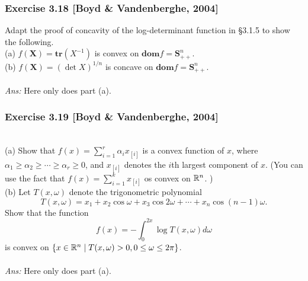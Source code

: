 \documentclass[12pt,a4paper]{article}
\newcommand{\INT}[2]{\int_{#1}^{#2}}
\newcommand\dom{\mathbf{dom}}
\def\R{\ifmmode\mathbb R\fi}
\def\vS{\mathbf{S}}
\def\vX{\mathbf{X}}
\begin{document}
\subsubsection*{Exercise 3.18 [Boyd \& Vandenberghe, 2004]}
\noindent Adapt the proof of concavity of the log-determinant function in \S 3.1.5 to show the following. \\
(a) $f(\vX) = \mathbf{tr}(X^{-1})$ is convex on $\dom f = \vS^n_{++}$.\\
(b) $f(\vX) = (\det X)^{1/n}$ is concave on $\dom f = \vS^n_{++}$.\\
\\
{\it Ans:} Here only does part (a). 



\newpage\subsubsection*{Exercise 3.19 [Boyd \& Vandenberghe, 2004]}
 \\
(a) Show that $f(x) = \sum^r_{i=1}\alpha_ix_{[i]}$ is a convex function of $x$, where $\alpha_1 \geq \alpha_2 \geq \cdots \geq \alpha_r \geq 0$, and $x_{[i]}$ denotes the $i$th largest component of $x$. (You can use the fact that $f(x) = \sum_{i=1}^k x_{[i]}$ os convex on $\R^n$. )\\
(b) Let $T(x, \omega)$ denote the trigonometric polynomial
$$T(x,\omega) = x_1 + x_2 \cos\omega + x_3\cos2\omega + \cdots + x_n\cos(n-1)\omega.$$
Show that the function
$$f(x) = -\INT0{2x} \log T(x,\omega)d\omega$$
is convex on $\{x \in \R^n \mid T(x,\omega)>0, 0\leq \omega \leq 2\pi\}$. \\
\\
{\it Ans:} Here only does part (a). 
\end{document}
